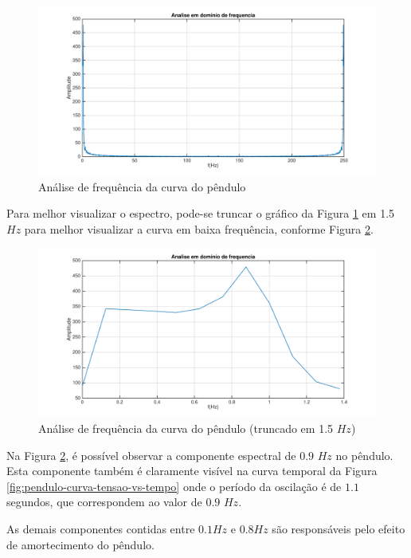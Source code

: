 \documentclass[a4paper]{instrumentacao}
\begin{document}
\begin{figure}[H]
\centering
\includegraphics[width=\textwidth]{frequency-plot.pdf}
\caption{Análise de frequência da curva do pêndulo}
\label{fig:pendulo-frequencia}
\end{figure}

Para melhor visualizar o espectro, pode-se truncar o gráfico da Figura \ref{fig:pendulo-frequencia} em 1.5 $Hz$ para melhor visualizar a curva em baixa frequência, conforme Figura \ref{fig:pendulo-frequencia-truncado}.

\begin{figure}[H]
\centering
\includegraphics[width=\textwidth]{frequency-plot-slice.pdf}
\caption{Análise de frequência da curva do pêndulo (truncado em 1.5 $Hz$)}
\label{fig:pendulo-frequencia-truncado}
\end{figure}

Na Figura \ref{fig:pendulo-frequencia-truncado}, é possível observar a componente espectral de $0.9$ $Hz$ no pêndulo. Esta componente também é claramente visível na curva temporal da Figura \ref{fig:pendulo-curva-tensao-vs-tempo} onde o período da oscilação é de $1.1$ segundos, que correspondem ao valor de $0.9$ $Hz$.

As demais componentes contidas entre $0.1 Hz$ e $0.8 Hz$ são responsáveis pelo efeito de amortecimento do pêndulo.
\end{document}

